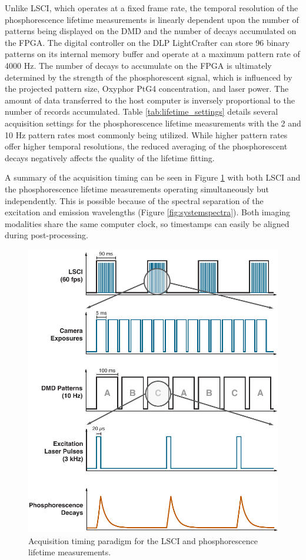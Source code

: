 Unlike LSCI, which operates at a fixed frame rate, the temporal resolution of the phosphorescence lifetime measurements is linearly dependent upon the number of patterns being displayed on the DMD and the number of decays accumulated on the FPGA. The digital controller on the DLP LightCrafter can store 96 binary patterns on its internal memory buffer and operate at a maximum pattern rate of 4000 Hz. The number of decays to accumulate on the FPGA is ultimately determined by the strength of the phosphorescent signal, which is influenced by the projected pattern size, Oxyphor PtG4 concentration, and laser power. The amount of data transferred to the host computer is inversely proportional to the number of records accumulated. Table \ref{tab:lifetime_settings} details several acquisition settings for the phosphorescence lifetime measurements with the 2 and 10 Hz pattern rates most commonly being utilized. While higher pattern rates offer higher temporal resolutions, the reduced averaging of the phosphorescent decays negatively affects the quality of the lifetime fitting.

A summary of the acquisition timing can be seen in Figure \ref{fig:timingschematic} with both LSCI and the phosphorescence lifetime measurements operating simultaneously but independently. This is possible because of the spectral separation of the excitation and emission wavelengths (Figure \ref{fig:systemspectra}). Both imaging modalities share the same computer clock, so timestamps can easily be aligned during post-processing.

\begin{figure}
    \includegraphics{figures/chapter_2/timingschematic.pdf}
    \caption{
        \label{fig:timingschematic}
        Acquisition timing paradigm for the LSCI and phosphorescence lifetime measurements.
    }
\end{figure}

